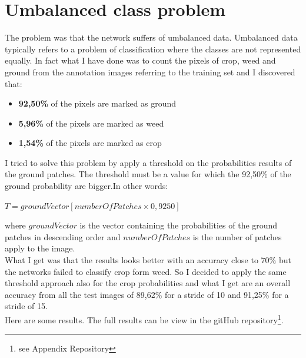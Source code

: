 \documentclass[]{report}
\begin{document}
\section{Umbalanced class problem}

The problem was that the network suffers of umbalanced data. Umbalanced data typically refers to a problem of classification where the classes are not represented equally. In fact what I have done was to count the pixels of crop, weed and ground from the annotation images referring to the training set and I discovered that:

\begin{itemize}

	\item \textbf{92,50\%} of the pixels are marked as ground
	\item \textbf{5,96\%} of the pixels are marked as weed
	\item \textbf{1,54\%} of the pixels are marked as crop

\end{itemize}

I tried to solve this problem by apply a threshold on the probabilities results of the ground patches. The threshold must be a value for which the 92,50\% of the ground probability are bigger.In other words:

\begin{center}
	$ T = groundVector[numberOfPatches\times 0,9250] $
\end{center}

where $groundVector $ is the vector containing the probabilities of the ground patches in descending order and $numberOfPatches $ is the number of patches apply to the image.\\
What I get was that the results looks better with an accuracy close to $ 70\% $ but the networks failed to classify crop form weed. So I decided to apply the same threshold approach also for the crop probabilities and what I get are an overall accuracy from all the test images of 89,62\% for a stride of 10 and 91,25\% for a stride of 15.\\
Here are some results. The full results can be view in the gitHub repository\footnote{see Appendix Repository}.
\end{document}
